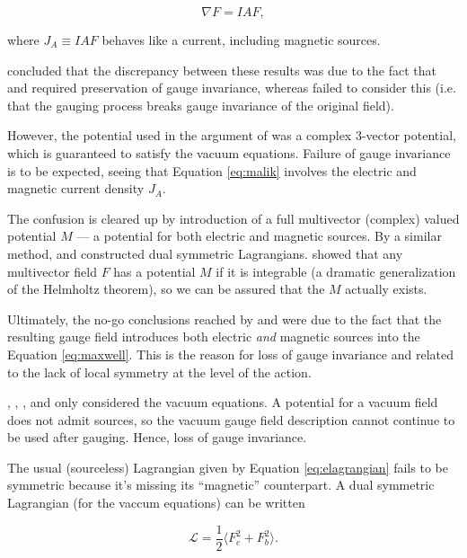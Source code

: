 \documentclass{article}
\begin{document}
  \begin{equation}
    \nabla F = I A F,\label{eq:malik}
  \end{equation}

  where $J_A \equiv IAF$ behaves like a current, including magnetic sources.

  \cite{saa} concluded that the discrepancy between these results was due to the fact that \cite{bunster} and \cite{deser} required preservation of gauge invariance, whereas \cite{malik} failed to consider this (i.e. that the gauging process breaks gauge invariance of the original field).  

  However, the potential used in the argument of \cite{saa} was a complex 3-vector potential, which is guaranteed to satisfy the vacuum equations. Failure of gauge invariance is to be expected, seeing that Equation \ref{eq:malik} involves the electric and magnetic current density $J_A$.

  The confusion is cleared up by introduction of a full multivector (complex) valued potential $M$ --- a potential for both electric and magnetic sources. By a similar method, \cite{dressel} and \cite{vasconcellos} constructed dual symmetric Lagrangians. \cite{cagc} showed that any multivector field $F$ has a potential $M$ if it is integrable (a dramatic generalization of the Helmholtz theorem), so we can be assured that the $M$ actually exists.

  Ultimately, the no-go conclusions reached by \cite{bunster} and \cite{deser} were due to the fact that the resulting gauge field introduces both electric \emph{and} magnetic sources into the Equation \ref{eq:maxwell}. This is the reason for loss of gauge invariance and related to the lack of local symmetry at the level of the action. 

  \cite{saa}, \cite{malik}, \cite{bunster}, and \cite{deser} only considered the vacuum equations. A potential for a vacuum field does not admit sources, so the vacuum gauge field description cannot continue to be used after gauging. Hence, loss of gauge invariance. 

  The usual (sourceless) Lagrangian given by Equation \ref{eq:elagrangian} fails to be symmetric because it's missing its ``magnetic'' counterpart. A dual symmetric Lagrangian (for the vaccum equations) can be written\cite{dressel}

  \begin{equation}
    \mathcal{L} = \frac{1}{2}\langle F_e^2 + F_b^2 \rangle.
  \end{equation}
\end{document}
